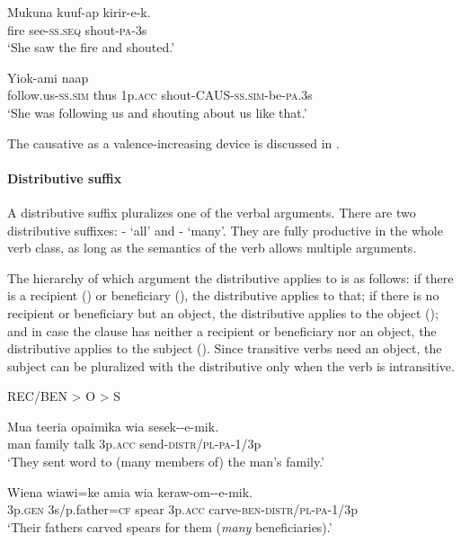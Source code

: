 \ea%
\label{ex:x991}
\gll Mukuna kuuf-ap kirir-e-k. \\
fire see-\textsc{ss}.\textsc{seq} shout-\textsc{pa}-3s\\
\glt`She saw the fire and shouted.'
\z

\ea%
\label{ex:x489}
\gll Yiok-ami naap   \\
follow.us-\textsc{ss}.\textsc{sim} thus 1p.\textsc{acc} shout-CAUS-\textsc{ss}.\textsc{sim}-be-\textsc{pa}.3s\\
\glt`She was following us and shouting about us like that.'
\z

The causative as a valence-increasing device is discussed in . 

\paragraph[Distributive suffix]{Distributive suffix}
{}
A distributive suffix pluralizes one of the verbal arguments. There are two distributive suffixes: \nobreakdash- `all' and \nobreakdash- `many'. They are fully productive in the whole verb class, as long as the semantics of the verb allows multiple arguments. 

The hierarchy of which argument the distributive applies to is as follows: if there is a recipient () or beneficiary (), the distributive applies to that; if there is no recipient or beneficiary but an object, the distributive applies to the object (); and in case the clause has neither a recipient or beneficiary nor an object, the distributive applies to the subject (). Since transitive verbs need an object, the subject can be pluralized with the distributive only when the verb is intransitive.

\ea
REC/BEN {{\textgreater}} O {{\textgreater}} S
\z

\ea%
\label{ex:x209}
\gll Mua teeria opaimika wia sesek--e-mik. \\
man family talk 3p.\textsc{acc} send-\textsc{distr}/\textsc{pl}-\textsc{pa}-1/3p \\
\glt`They sent word to (many members of) the man's family.'
\z

\ea%
\label{ex:x429}
\gll Wiena wiawi=ke amia wia keraw-om--e-mik. \\
3p.\textsc{gen} 3s/p.father=\textsc{cf} spear 3p.\textsc{acc} carve-\textsc{ben}-\textsc{distr}/\textsc{pl}-\textsc{pa}-1/3p\\
\glt`Their fathers carved spears for them (\textit{many} beneficiaries).'
\z

